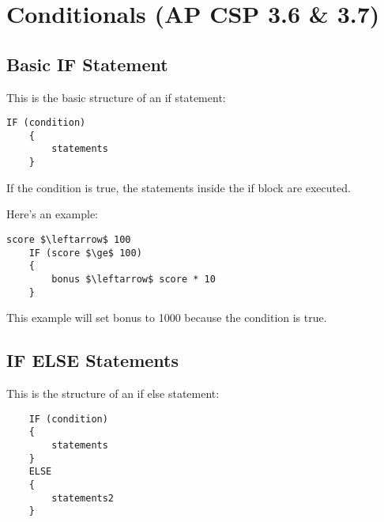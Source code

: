 \documentclass{article}
\newcommand{\hlc}[2][yellow]{ {\sethlcolor{#1} \hl{#2}} }
\begin{document}


\section*{Conditionals (AP CSP 3.6 \& 3.7)}


\subsection*{Basic IF Statement}

This is the basic structure of an if statement:
\begin{lstlisting}[mathescape=true]
    IF (condition)
    {
        statements
    }
\end{lstlisting}
If the condition is true, the statements inside the if block are executed.

Here's an example:
\begin{lstlisting}[mathescape=true]
    score $\leftarrow$ 100
    IF (score $\ge$ 100)
    {
        bonus $\leftarrow$ score * 10
    }
\end{lstlisting}
This example will set bonus to 1000 because the condition is true.


\subsection*{IF ELSE Statements}

This is the structure of an if else statement:
\begin{lstlisting}
    IF (condition)
    {
        statements
    }
    ELSE
    {
        statements2
    }
\end{lstlisting}
\end{document}
